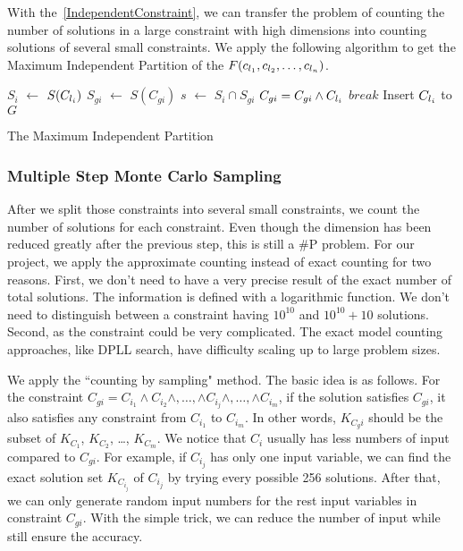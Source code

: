 With the~\ref{IndependentConstraint}, we can transfer the problem of counting the number of 
solutions in a large constraint with high
dimensions into counting solutions of 
several small constraints. We apply the following algorithm to get the Maximum Independent Partition
of the $F(c_{l_{1}},c_{l_{2}},\ldots,c_{l_{n}})$.

\IncMargin{1em}
\begin{algorithm}[h]
\DontPrintSemicolon
{}
{
   $S_i$ $\leftarrow$ $S(C_{l_{i}})$ \;
   {
   $S_{gi}$ $\leftarrow$ $S(C_{gi})$ \;
   $s$ $\leftarrow$ $S_i \cap S_{gi}$  \;
   {
      $C_{gi} = C_{gi} \land C_{l_{i}}$ \;
      $break$ \;
   }
   Insert $C_{l_{i}}$ to $G$
   }
}
\caption{The Maximum Independent Partition}
\end{algorithm}
\DecMargin{1em}

\subsubsection{Multiple Step Monte Carlo Sampling}

After we split those constraints into several small constraints, we count
the number of solutions for each constraint. Even though the dimension
has been reduced greatly after the previous step, this is still a
\#P problem. For our project, we apply the approximate counting instead of
exact counting for two reasons. First, we don't need to have a very precise
result of the exact number of total solutions. The information is defined with
a logarithmic function. We don't need to distinguish between a constraint having
$10^{10}$ and $10^{10} + 10$ solutions.
Second, as the constraint could be very complicated. The exact model counting
approaches, like DPLL search, have difficulty scaling up to large problem sizes.

We apply the ``counting by sampling" method. The basic idea is as follows.
For the constraint $C_{gi}= C_{i_1} \land C_{i_2} \land ,\ldots, \land C_{i_j} \land ,\ldots, 
\land C_{i_m}$, 
if the solution satisfies $C_{gi}$, it also
satisfies any constraint from $C_{i_1}$ to $C_{i_m}$. In other words,
$K_{C_gi}$ should be the subset of $K_{C_1}$, $K_{C_2}$, \ldots , $K_{C_m}$.
We notice that $C_i$ usually has less numbers of input compared to $C_{gi}$.
For example, if $C_{i_j}$ has only one input variable, we can find the exact
solution set $K_{C_{i_j}}$ of $C_{i_j}$ by trying every possible 256 solutions. After that,
we can only generate random input numbers for the rest input variables in 
constraint $C_{gi}$. With the simple trick, we can reduce the number of input while
still ensure the accuracy.

